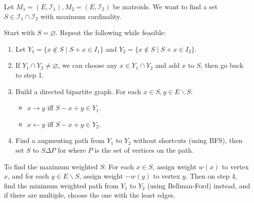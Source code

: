 Let $M_1 = (E, \mathcal{I}_1), M_2 = (E, \mathcal{I}_2)$ be matroids.
We want to find a set $S \in \mathcal{I}_1 \cap \mathcal{I}_2$ with maximum cardinality.

Start with $S = \varnothing$. Repeat the following while feasible:
\begin{enumerate}
    \item Let $Y_1 = \{ x \not\in S \mid S + x \in I_1 \}$ and $Y_2 = \{ x \not\in S \mid S + x \in I_2 \}$.
    \item If $Y_1 \cap Y_2 \neq \varnothing$, we can choose any $x \in Y_1 \cap Y_2$ and add $x$ to $S$, then go back to step 1.
    \item Build a directed bipartite graph. For each $x \in S, y \in E \backslash S$:
        \begin{itemize}
            \item $x \rightarrow y$ iff $S - x + y \in Y_1$.
            \item $x \leftarrow y$ iff $S - x + y \in Y_2$.
        \end{itemize}
    \item Find a augmenting path from $Y_1$ to $Y_2$ without shortcuts (using BFS), then set $S$ to $S \Delta P$ for where $P$ is the set of vertices on the path.
\end{enumerate}

To find the maximum weighted $S$:
For each $x \in S$, assign weight $w(x)$ to vertex $x$, and for each $y \in E \backslash S$, assign weight $-w(y)$ to vertex $y$.
Then on step 4, find the minimum weighted path from $Y_1$ to $Y_2$ (using Bellman-Ford) instead, and if there are multiple, choose the one with the least edges.
